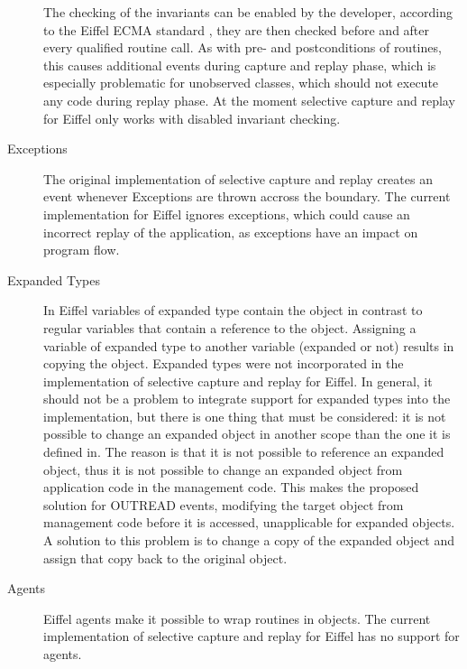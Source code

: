 \begin{description}
The checking of the invariants can be enabled by the developer, according to the Eiffel ECMA standard \cite{Eiffel-ECMA}, they are then checked before and after every qualified routine call. As with pre- and postconditions of routines, this causes additional events during capture and replay phase, which is especially problematic for unobserved classes, which should not execute any code during replay phase. At the moment selective capture and replay for Eiffel only works with disabled invariant checking.
 \item [Exceptions] The original implementation of selective capture and replay creates an event whenever Exceptions are thrown accross the boundary. The current implementation for Eiffel ignores exceptions, which could cause an incorrect replay of the application, as exceptions have an impact on program flow. %
 \item [Expanded Types] In Eiffel variables of expanded type contain the object in contrast to regular variables that contain a reference to the object. Assigning a variable of expanded type to another variable (expanded or not) results in copying the object. Expanded types were not incorporated in the implementation of selective capture and replay for Eiffel. In general, it should not be a problem to integrate support for expanded types into the implementation, but there is one thing that must be considered: it is not possible to change an expanded object in another scope than the one it is defined in. The reason is that it is not possible to reference an expanded object, thus it is not possible to change an expanded object from application code in the management code. This makes the proposed solution for OUTREAD events, modifying the target object from management code before it is accessed, unapplicable for expanded objects. A solution to this problem is to change a copy of the expanded object and assign that copy back to the original object.
 \item [Agents] Eiffel agents make it possible to wrap routines in objects. The current implementation of selective capture and replay for Eiffel has no support for agents.

\end{description}
